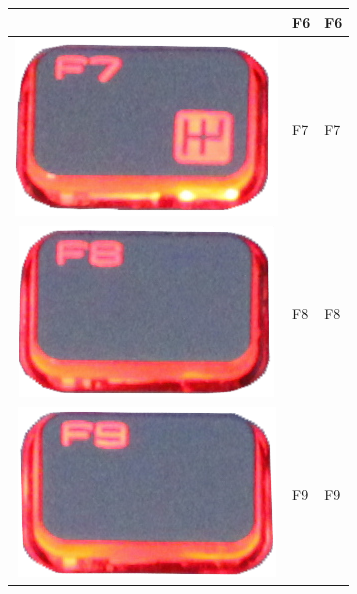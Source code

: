 \begin{longtable}{|cll|}
\begin{minipage}[c]{.4\textwidth}
\vspace{0.2cm}
\end{minipage} & F6 & F6\\
\hline
\begin{minipage}[c]{.4\textwidth}
\vspace{0.2cm}
\includegraphics[scale=0.08]{Images/KeyMapping/F7}
\vspace{0.2cm}
\end{minipage} & F7 & F7\\
\hline
\begin{minipage}[c]{.4\textwidth}
\vspace{0.2cm}
\includegraphics[scale=0.08]{Images/KeyMapping/F8}
\vspace{0.2cm}
\end{minipage} & F8 & F8\\
\hline
\begin{minipage}[c]{.4\textwidth}
\vspace{0.2cm}
\includegraphics[scale=0.08]{Images/KeyMapping/F9}
\vspace{0.2cm}
\end{minipage} & F9 & F9\\

\end{longtable}
